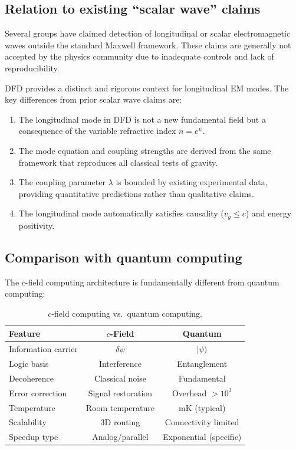 \documentclass[aps,prd,twocolumn,superscriptaddress,nofootinbib,floatfix]{revtex4-2}
\newcommand{\psifield}{\psi}
\newcommand{\cvac}{c}
\begin{document}
\subsection{Relation to existing ``scalar wave'' claims}

Several groups have claimed detection of longitudinal or scalar
electromagnetic waves outside the standard Maxwell framework.
These claims are generally not accepted by the physics community
due to inadequate controls and lack of reproducibility.

DFD provides a distinct and rigorous context for longitudinal EM
modes. The key differences from prior scalar wave claims are:

\begin{enumerate}
\item The longitudinal mode in DFD is not a new fundamental field
but a consequence of the variable refractive index
$n = e^\psifield$.

\item The mode equation and coupling strengths are derived from
the same framework that reproduces all classical tests of gravity.

\item The coupling parameter $\lambda$ is bounded by existing
experimental data, providing quantitative predictions rather than
qualitative claims.

\item The longitudinal mode automatically satisfies causality
($v_g \leq \cvac$) and energy positivity.
\end{enumerate}

\subsection{Comparison with quantum computing}

The $c$-field computing architecture is fundamentally different
from quantum computing:

\begin{table}[h]
\caption{$c$-field computing vs.\ quantum computing.}
\label{tab:quantum_comparison}
\begin{ruledtabular}
\begin{tabular}{lcc}
Feature & $c$-Field & Quantum \\
\hline
Information carrier & $\delta\psifield$ & $|\psi\rangle$ \\
Logic basis & Interference & Entanglement \\
Decoherence & Classical noise & Fundamental \\
Error correction & Signal restoration & Overhead $> 10^3$ \\
Temperature & Room temperature & mK (typical) \\
Scalability & 3D routing & Connectivity limited \\
Speedup type & Analog/parallel & Exponential (specific) \\
\end{tabular}
\end{ruledtabular}
\end{table}
\end{document}
